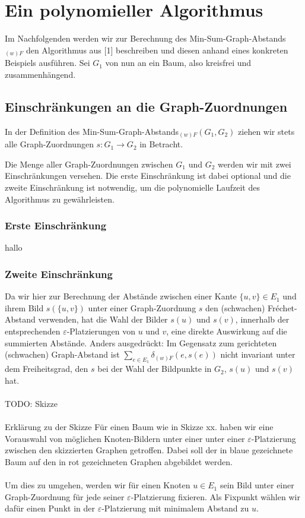 \documentclass[a4paper, 12pt, twoside]{article}
\theoremstyle{Format1} %
\begin{document}
\section{Ein polynomieller Algorithmus}

Im Nachfolgenden werden wir zur Berechnung des Min-Sum-Graph-Abstands$_{(w)F}$ den Algorithmus aus [1] beschreiben und diesen anhand eines konkreten Beispiels ausführen.
Sei $G_1$ von nun an ein Baum, also kreisfrei und zusammenhängend.

\subsection{Einschränkungen an die Graph-Zuordnungen} \label{Einschränkungen}
In der Definition des Min-Sum-Graph-Abstands$_{(w)F}(G_1, G_2)$ ziehen wir stets alle Graph-Zuordnungen $s: G_1 \to G_2$ in Betracht.

Die Menge aller Graph-Zuordnungen zwischen $G_1$ und $G_2$ werden wir mit zwei Einschränkungen versehen.
Die erste Einschränkung ist dabei optional und die zweite Einschränkung ist notwendig, um die polynomielle Laufzeit des Algorithmus zu gewährleisten.
\subsubsection{Erste Einschränkung}
hallo
\subsubsection{Zweite Einschränkung} \label {Zweite Einschränkung}
Da wir hier zur Berechnung der Abstände zwischen einer Kante $\{u,v\} \in E_1$ und ihrem Bild $s(\{u,v\})$ unter einer Graph-Zuordnung $s$ den (schwachen) Fréchet-Abstand verwenden,
hat die Wahl der Bilder $s(u)$ und $s(v)$, innerhalb der entsprechenden $\varepsilon$-Platzierungen von $u$ und $v$, eine direkte Auswirkung auf die summierten Abstände.
Anders ausgedrückt: Im Gegensatz zum gerichteten (schwachen) Graph-Abstand ist $\sum_{e \in E_1}\delta_{(w)F}(e, s(e))$ nicht invariant unter dem Freiheitsgrad, den $s$
bei der Wahl der Bildpunkte in $G_2$, $s(u)$ und $s(v)$ hat.
\\
\\
TODO: Skizze
\\
\\
Erklärung zu der Skizze
Für einen Baum wie in Skizze xx. haben wir eine Vorauswahl von möglichen Knoten-Bildern unter einer unter einer $\varepsilon$-Platzierung zwischen den skizzierten Graphen getroffen.
Dabei soll der in blaue gezeichnete Baum auf den in rot gezeichneten Graphen abgebildet werden.
\\
\\
Um dies zu umgehen, werden wir für einen Knoten $u \in E_1$ sein Bild unter einer Graph-Zuordnung für jede seiner $\varepsilon$-Platzierung fixieren.
Als Fixpunkt wählen wir dafür einen Punkt in der $\varepsilon$-Platzierung mit minimalem Abstand zu $u$.
\end{document}
